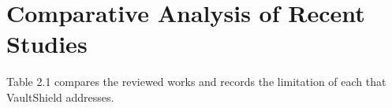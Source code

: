 \documentclass[12pt,a4paper,oneside]{report}
\newcommand{\TableCapGap}{6pt}
\begin{document}
\section{Comparative Analysis of Recent Studies}\label{comparative-analysis-of-recent-studies}

Table 2.1 compares the reviewed works and records the limitation of each that VaultShield addresses.

\begingroup\small

\par\vspace{\TableCapGap}
\noindent\begin{minipage}{\textwidth}
\label{tab:2-1}
\end{minipage}
\par
\end{document}
